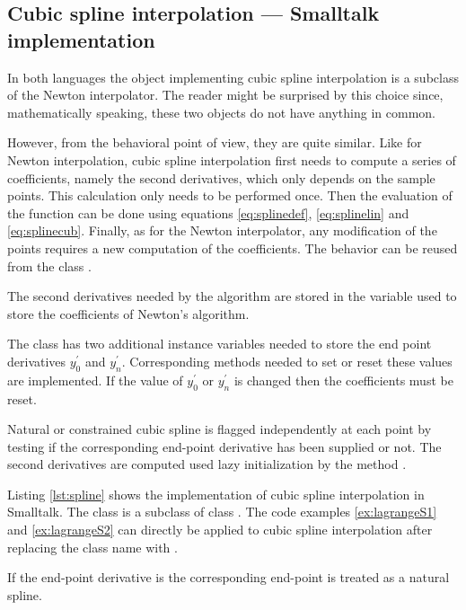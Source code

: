 \subsection{Cubic spline interpolation --- Smalltalk  implementation}
 In both languages the object
implementing cubic spline interpolation is a subclass of the
Newton interpolator. The reader might be surprised by this choice
since, mathematically speaking, these two objects do not have
anything in common.

However, from the behavioral point of view, they are quite
similar. Like for Newton interpolation, cubic spline interpolation
first needs to compute a series of coefficients, namely the second
derivatives, which only depends on the sample points. This
calculation only needs to be performed once. Then the evaluation
of the function can be done using equations \ref{eq:splinedef},
\ref{eq:splinelin} and \ref{eq:splinecub}. Finally, as for the
Newton interpolator, any modification of the points requires a new
computation of the coefficients. The behavior can be reused from
the class .

The second derivatives needed by the algorithm are stored in the
variable used to store the coefficients of Newton's algorithm.

The class  has two additional instance
variables needed to store the end point derivatives $y^{\prime}_0$
and $y^{\prime}_n$. Corresponding methods needed to set or reset
these values are implemented. If the value of $y^{\prime}_0$ or
$y^{\prime}_n$ is changed then the coefficients must be reset.

Natural or constrained cubic spline is flagged independently at
each point by testing if the corresponding end-point derivative
has been supplied or not. The second derivatives are computed used
lazy initialization by the method .

Listing \ref{lst:spline} shows the implementation of cubic spline
interpolation in Smalltalk. The class 
is a subclass of class . The code
examples \ref{ex:lagrangeS1} and \ref{ex:lagrangeS2} can directly
be applied to cubic spline interpolation after replacing the class
name  with .

If the end-point derivative is  the corresponding
end-point is treated as a natural spline.

